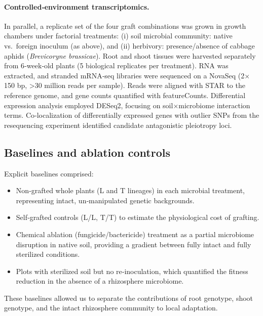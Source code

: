 \documentclass{article}
\begin{document}
\begin{itemize}
\paragraph{Controlled‑environment transcriptomics.} In parallel, a replicate set of the four graft combinations was grown in growth chambers under factorial treatments: (i) soil microbial community: native vs.\ foreign inoculum (as above), and (ii) herbivory: presence/absence of cabbage aphids (\textit{Brevicoryne brassicae}). Root and shoot tissues were harvested separately from 6‑week‑old plants (5 biological replicates per treatment). RNA was extracted, and stranded mRNA‑seq libraries were sequenced on a NovaSeq (2\(\times\)150 bp, >30 million reads per sample). Reads were aligned with STAR to the reference genome, and gene counts quantified with featureCounts. Differential expression analysis employed DESeq2, focusing on soil\(\times\)microbiome interaction terms. Co‑localization of differentially expressed genes with outlier SNPs from the resequencing experiment identified candidate antagonistic pleiotropy loci.

\subsection{Baselines and ablation controls}
Explicit baselines comprised:
\begin{itemize}
    \item Non‑grafted whole plants (L and T lineages) in each microbial treatment, representing intact, un‑manipulated genetic backgrounds.
    \item Self‑grafted controls (L/L, T/T) to estimate the physiological cost of grafting.
    \item Chemical ablation (fungicide/bactericide) treatment as a partial microbiome disruption in native soil, providing a gradient between fully intact and fully sterilized conditions.
    \item Plots with sterilized soil but no re‑inoculation, which quantified the fitness reduction in the absence of a rhizosphere microbiome.
\end{itemize}
These baselines allowed us to separate the contributions of root genotype, shoot genotype, and the intact rhizosphere community to local adaptation.


\end{itemize}
\end{document}
